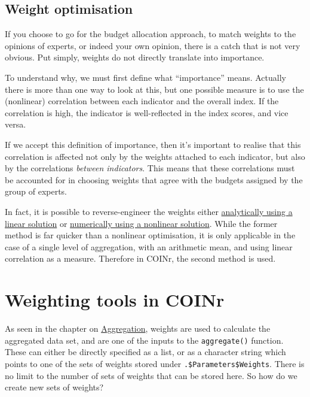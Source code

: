 \documentclass[
]{book}
\begin{document}
\hypertarget{weight-optimisation}{%
\subsection{Weight optimisation}\label{weight-optimisation}}

If you choose to go for the budget allocation approach, to match weights to the opinions of experts, or indeed your own opinion, there is a catch that is not very obvious. Put simply, weights do not directly translate into importance.

To understand why, we must first define what ``importance'' means. Actually there is more than one way to look at this, but one possible measure is to use the (nonlinear) correlation between each indicator and the overall index. If the correlation is high, the indicator is well-reflected in the index scores, and vice versa.

If we accept this definition of importance, then it's important to realise that this correlation is affected not only by the weights attached to each indicator, but also by the correlations \emph{between indicators}. This means that these correlations must be accounted for in choosing weights that agree with the budgets assigned by the group of experts.

In fact, it is possible to reverse-engineer the weights either \href{https://doi.org/10.1111/j.1467-985X.2012.01059.x}{analytically using a linear solution} or \href{https://doi.org/10.1016/j.ecolind.2017.03.056}{numerically using a nonlinear solution}. While the former method is far quicker than a nonlinear optimisation, it is only applicable in the case of a single level of aggregation, with an arithmetic mean, and using linear correlation as a measure. Therefore in COINr, the second method is used.

\hypertarget{weighting-tools-in-coinr}{%
\section{Weighting tools in COINr}\label{weighting-tools-in-coinr}}

As seen in the chapter on \protect\hyperlink{aggregation}{Aggregation}, weights are used to calculate the aggregated data set, and are one of the inputs to the \texttt{aggregate()} function. These can either be directly specified as a list, or as a character string which points to one of the sets of weights stored under \texttt{.\$Parameters\$Weights}. There is no limit to the number of sets of weights that can be stored here. So how do we create new sets of weights?
\end{document}
